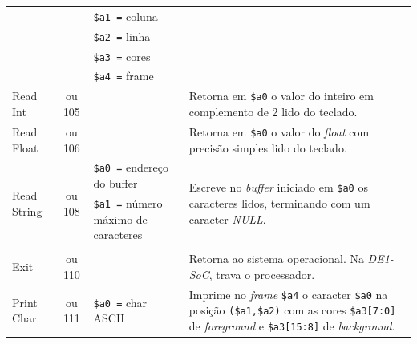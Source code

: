 \begin{longtable}{|l|c|p{3.5cm}|l |}
            & & \texttt{\$a1 =} coluna      & \\*
            & & \texttt{\$a2 =} linha       & \\*
            & & \texttt{\$a3 =} cores       & \\*
            & & \texttt{\$a4 =} frame       & \\
        \hline
        \multirow{3}{*}{Read Int}           & \multirow{3}{*}{\parbox{0.6cm}{ ou 105}}
            &                               & \multirow{3}{*}{\parbox{7cm}{Retorna em \texttt{\$a0} o valor do inteiro em complemento de 2 lido do teclado.}}\\*
            & & & \\*
            & & & \\
        \hline
        \multirow{3}{*}{Read Float}         & \multirow{3}{*}{\parbox{0.6cm}{ ou 106}}
            &                               & \multirow{3}{*}{\parbox{7cm}{Retorna em \texttt{\$a0} o valor do \textit{float} com precisão simples lido do teclado.}}\\*
            & & & \\*
            & & & \\
        \hline
        \multirow{3}{*}{Read String}        & \multirow{3}{*}{\parbox{0.6cm}{ ou 108}}
            & \texttt{\$a0 =} endereço do buffer    & \multirow{3}{*}{\parbox{7cm}{Escreve no \textit{buffer} iniciado em \texttt{\$a0} os caracteres lidos, terminando com um caracter \textit{NULL}.}}\\*
            & & \texttt{\$a1 =} número máximo de caracteres & \\*
            & & & \\
        \hline
        \multirow{3}{*}{Exit}               & \multirow{3}{*}{\parbox{0.6cm}{ ou 110}}
            &                               & \multirow{3}{*}{\parbox{7cm}{Retorna ao sistema operacional. Na \textit{DE1-SoC}, trava o processador.}}\\*
            & & & \\*
            & & & \\
        \hline
        \multirow{5}{*}{Print Char}         & \multirow{5}{*}{\parbox{0.6cm}{ ou 111}}
              & \texttt{\$a0 =} char ASCII  & \multirow{5}{*}{\parbox{7cm}{Imprime no \textit{frame} \texttt{\$a4} o caracter \texttt{\$a0} na
                                                posição \texttt{(\$a1,\$a2)} com as cores \texttt{\$a3[7:0]} de \textit{foreground} e \texttt{\$a3[15:8]} de \textit{background}.}}\\*

\end{longtable}
